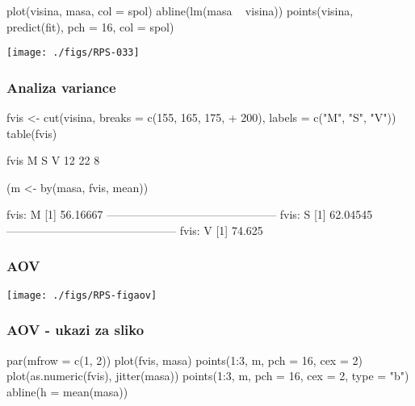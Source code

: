 \begin{frame}[fragile]
\frametitle{}
\begin{Schunk}
\begin{Sinput}
  plot(visina, masa, col = spol)
  abline(lm(masa ~ visina))
  points(visina, predict(fit), pch = 16, col = spol)
\end{Sinput}
\end{Schunk}
\texttt{[image: ./figs/RPS-033]}
\end{frame}

\begin{frame}[fragile]
\frametitle{Analiza variance}
\begin{Schunk}
\begin{Sinput}
  fvis <- cut(visina, breaks = c(155, 165, 175, 
+     200), labels = c("M", "S", "V"))
  table(fvis)
\end{Sinput}
\begin{Soutput}
fvis
 M  S  V 
12 22  8 
\end{Soutput}
\begin{Sinput}
  (m <- by(masa, fvis, mean))
\end{Sinput}
\begin{Soutput}
fvis: M
[1] 56.16667
--------------------------------------------- 
fvis: S
[1] 62.04545
--------------------------------------------- 
fvis: V
[1] 74.625
\end{Soutput}
\end{Schunk}
\end{frame}

\begin{frame}[fragile]
\frametitle{AOV}
\texttt{[image: ./figs/RPS-figaov]}
\end{frame}

\begin{frame}[fragile]
\frametitle{AOV - ukazi za sliko}
\begin{Schunk}
\begin{Sinput}
  par(mfrow = c(1, 2))
  plot(fvis, masa)
  points(1:3, m, pch = 16, cex = 2)
  plot(as.numeric(fvis), jitter(masa))
  points(1:3, m, pch = 16, cex = 2, type = "b")
  abline(h = mean(masa))
\end{Sinput}
\end{Schunk}
\end{frame}


